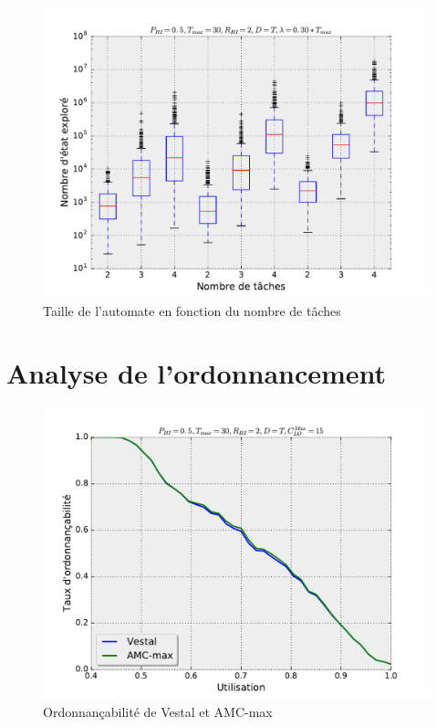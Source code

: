 \documentclass[12pt,a4paper,oneside]{book}
\theoremstyle{break}
\theoremstyle{breakplain}
\begin{document}
\begin{figure}[h]
\includegraphics[width=\textwidth]{./results/taskvssize.pdf}
\caption{Taille de l'automate en fonction du nombre de tâches}
\end{figure}

\section{Analyse de l'ordonnancement}

\begin{figure}[h]
\includegraphics[width=\textwidth]{./results/perfAMCVestal.pdf}
\caption{Ordonnançabilité de Vestal et AMC-max}
\end{figure}
\end{document}
